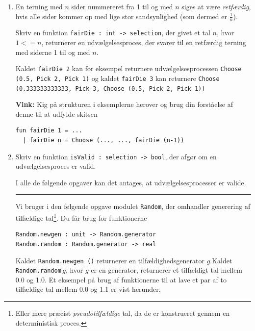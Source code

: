 \documentclass[a4paper,12pt]{article}
\begin{document}
\begin{enumerate}[{5}M1]

\item En terning med $n$ sider nummereret fra 1 til og med $n$ siges
  at være \emph{retfærdig}, hvis alle sider kommer op med lige stor
  sandsynlighed (som dermed er $\frac{1}{n}$).

  Skriv en funktion \lstinline{fairDie : int -> selection}, der givet
  et tal $n$, hvor $1 <= n$, returnerer en udvælgelsesproces, der
  svarer til en retfærdig terning med siderne 1 til og med $n$.

  Kaldet \lstinline{fairDie 2} kan for eksempel returnere
  udvælgelsesprocessen\newline
  \lstinline{Choose (0.5, Pick 2, Pick 1)} og kaldet
  \lstinline{fairDie 3} kan returnere\newline
  \lstinline{Choose (0.333333333333, Pick 3, Choose (0.5, Pick 2, Pick 1))}

  \textbf{Vink:} Kig på strukturen i eksemplerne herover og brug din
  forståelse af denne til at udfylde skitsen

\begin{lstlisting}
fun fairDie 1 = ...
  | fairDie n = Choose (..., ..., fairDie (n-1))
\end{lstlisting}

\item Skriv en funktion \lstinline{isValid : selection -> bool}, der
  afgør om en udvælgelsesproces er valid.

I alle de følgende opgaver kan det antages, at udvælgelsesprocesser er
valide.

\vspace{2ex}
\hrule
\vspace{2ex}

Vi bruger i den følgende opgave modulet \lstinline{Random},
der omhandler generering af tilfældige tal\footnote{Eller mere præcist
  \emph{pseudotilfældige} tal, da de er konstrueret gennem en
  deterministisk proces.}.  Du får brug for funktionerne

\begin{lstlisting}
Random.newgen : unit -> Random.generator
Random.random : Random.generator -> real
\end{lstlisting}

Kaldet \lstinline{Random.newgen ()} returnerer en
tilfældighedsgenerator $g$.\newline Kaldet
\lstinline{Random.random}\,$g$, hvor $g$ er en generator, returnerer
et tilfældigt tal mellem 0.0 og 1.0.  Et eksempel på brug af
funktionerne til at lave et par af to tilfældige tal mellem 0.0 og 1.1
er vist herunder.


\end{enumerate}
\end{document}

